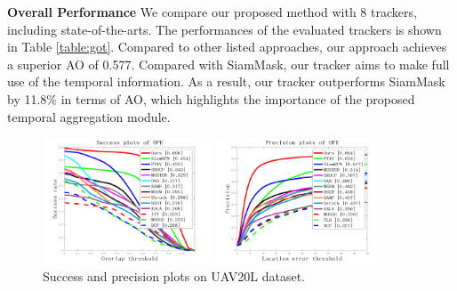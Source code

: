\textbf{Overall Performance}
We compare our proposed method with 8 trackers, including state-of-the-arts.
The performances of the evaluated trackers is shown in Table \ref{table:got}.
Compared to other listed approaches, our approach achieves a superior AO of 0.577.
Compared with SiamMask, our tracker aims to make full use of the temporal information. As a result, our tracker outperforms SiamMask by 11.8\% in terms of AO, which highlights the importance of the proposed temporal aggregation module.

\begin{figure}[t]
\begin{minipage}[b]{.48\linewidth}
  \centering
  \centerline{\includegraphics[width=5.0cm]{Img/end/quality_plot_overlap_OPE_AUC.png}}
\end{minipage}
\hfill
\begin{minipage}[b]{0.48\linewidth}
  \centering
  \centerline{\includegraphics[width=5.0cm]{Img/end/quality_plot_error_OPE_threshold.png}}
\end{minipage}
\vspace{-5mm}
%
\caption{Success and precision plots on UAV20L dataset.}
\vspace{-3mm}
\label{fig:uav20l}
%
\end{figure}
\vspace{-2mm}
